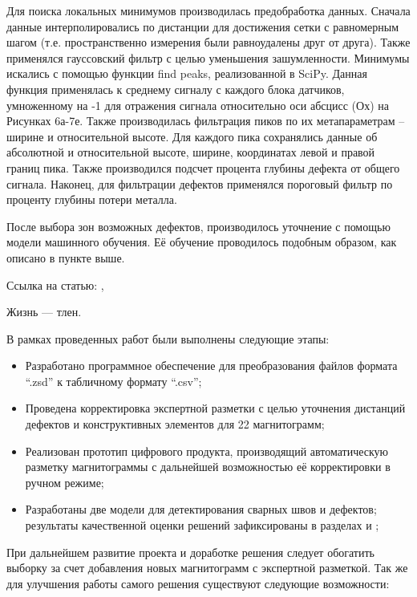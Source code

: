 \documentclass[a4paper,article,14pt]{extarticle}
\begin{document}
Для поиска локальных минимумов производилась предобработка данных. Сначала данные интерполировались по 
дистанции для достижения сетки с равномерным шагом (т.е. пространственно измерения были равноудалены друг от друга). 
Также применялся гауссовский фильтр с целью уменьшения зашумленности. Минимумы искались с помощью функции find peaks, 
реализованной в SciPy. Данная функция применялась к среднему сигналу с каждого блока датчиков, умноженному на -1 
для отражения сигнала относительно оси абсцисс (Ох) на Рисунках 6а-7е. Также производилась фильтрация пиков по их 
метапараметрам – ширине и относительной высоте. Для каждого пика сохранялись данные об абсолютной и относительной 
высоте, ширине, координатах левой и правой границ пика. Также производился подсчет процента глубины дефекта от общего 
сигнала. Наконец, для фильтрации дефектов применялся пороговый фильтр по проценту глубины потери металла.

После выбора зон возможных дефектов, производилось уточнение с помощью модели машинного обучения. Её обучение 
проводилось подобным образом, как описано в пункте выше.










Ссылка на статью: \cite{voc}, \cite{vo2}

Жизнь --- тлен.


В рамках проведенных работ были выполнены следующие этапы:

\begin{itemize}
    \item Разработано программное обеспечение для преобразования файлов формата “.zsd” к табличному формату “.csv”;
    \item Проведена корректировка экспертной разметки с целью уточнения дистанций дефектов и конструктивных элементов для 22 магнитограмм; 
    \item Реализован прототип цифрового продукта, производящий автоматическую разметку магнитограммы с дальнейшей возможностью её корректировки в ручном режиме;
    \item Разработаны две модели для детектирования сварных швов и дефектов; результаты качественной оценки решений зафиксированы в разделах  и ; 
\end{itemize}

При дальнейшем развитие проекта и доработке решения следует обогатить выборку за счет добавления новых магнитограмм 
с экспертной разметкой. Так же для улучшения работы самого решения существуют следующие возможности:
\end{document}
